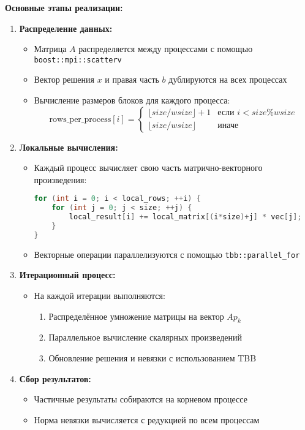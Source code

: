 \documentclass[12pt]{article}
\begin{document}
\textbf{Основные этапы реализации:}
\begin{enumerate}
    \item \textbf{Распределение данных:}
    \begin{itemize}
        \item Матрица $A$ распределяется между процессами с помощью \texttt{boost::mpi::scatterv}
        \item Вектор решения $x$ и правая часть $b$ дублируются на всех процессах
        \item Вычисление размеров блоков для каждого процесса:
        \[
        \text{rows\_per\_process}[i] = \begin{cases}
        \lfloor size/wsize \rfloor + 1 & \text{если } i < size\%wsize \\
        \lfloor size/wsize \rfloor & \text{иначе}
        \end{cases}
        \]
    \end{itemize}

    \item \textbf{Локальные вычисления:}
    \begin{itemize}
        \item Каждый процесс вычисляет свою часть матрично-векторного произведения:
        \begin{lstlisting}[language=C++]
for (int i = 0; i < local_rows; ++i) {
    for (int j = 0; j < size; ++j) {
        local_result[i] += local_matrix[(i*size)+j] * vec[j];
    }
}
        \end{lstlisting}
        \item Векторные операции параллелизуются с помощью \texttt{tbb::parallel\_for}
    \end{itemize}

    \item \textbf{Итерационный процесс:}
    \begin{itemize}
        \item На каждой итерации выполняются:
        \begin{enumerate}
            \item Распределённое умножение матрицы на вектор $Ap_k$
            \item Параллельное вычисление скалярных произведений
            \item Обновление решения и невязки с использованием TBB
        \end{enumerate}
    \end{itemize}

    \item \textbf{Сбор результатов:}
    \begin{itemize}
        \item Частичные результаты собираются на корневом процессе
        \item Норма невязки вычисляется с редукцией по всем процессам
    \end{itemize}
\end{enumerate}
\end{document}
